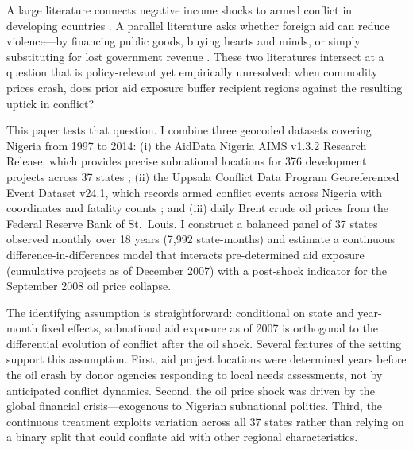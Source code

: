 \documentclass[12pt]{article}
\begin{document}
A large literature connects negative income shocks to armed conflict in developing countries \citep{miguel2004economic, blattman2010civil, dube2013commodity}. A parallel literature asks whether foreign aid can reduce violence---by financing public goods, buying hearts and minds, or simply substituting for lost government revenue \citep{berman2011can, crost2014aid, collier2004aid}. These two literatures intersect at a question that is policy-relevant yet empirically unresolved: when commodity prices crash, does prior aid exposure buffer recipient regions against the resulting uptick in conflict?

This paper tests that question. I combine three geocoded datasets covering Nigeria from 1997 to 2014: (i) the AidData Nigeria AIMS v1.3.2 Research Release, which provides precise subnational locations for 376 development projects across 37 states \citep{tierney2011more, strandow2011taking}; (ii) the Uppsala Conflict Data Program Georeferenced Event Dataset v24.1, which records armed conflict events across Nigeria with coordinates and fatality counts \citep{sundberg2013introducing}; and (iii) daily Brent crude oil prices from the Federal Reserve Bank of St.\ Louis. I construct a balanced panel of 37 states observed monthly over 18 years (7,992 state-months) and estimate a continuous difference-in-differences model that interacts pre-determined aid exposure (cumulative projects as of December 2007) with a post-shock indicator for the September 2008 oil price collapse.

The identifying assumption is straightforward: conditional on state and year-month fixed effects, subnational aid exposure as of 2007 is orthogonal to the differential evolution of conflict after the oil shock. Several features of the setting support this assumption. First, aid project locations were determined years before the oil crash by donor agencies responding to local needs assessments, not by anticipated conflict dynamics. Second, the oil price shock was driven by the global financial crisis---exogenous to Nigerian subnational politics. Third, the continuous treatment exploits variation across all 37 states rather than relying on a binary split that could conflate aid with other regional characteristics.
\end{document}

